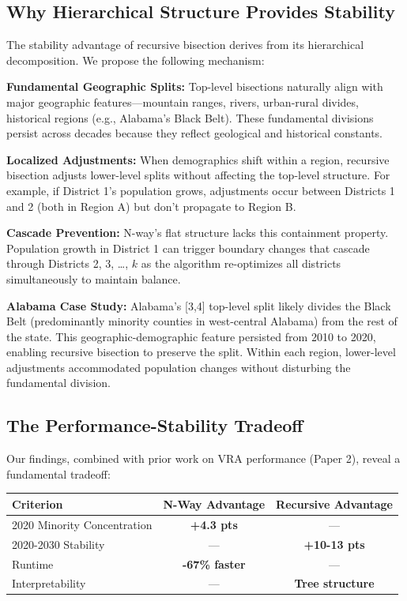 \subsection{Why Hierarchical Structure Provides Stability}

The stability advantage of recursive bisection derives from its hierarchical decomposition. We propose the following mechanism:

\textbf{Fundamental Geographic Splits:} Top-level bisections naturally align with major geographic features—mountain ranges, rivers, urban-rural divides, historical regions (e.g., Alabama's Black Belt). These fundamental divisions persist across decades because they reflect geological and historical constants.

\textbf{Localized Adjustments:} When demographics shift within a region, recursive bisection adjusts lower-level splits without affecting the top-level structure. For example, if District 1's population grows, adjustments occur between Districts 1 and 2 (both in Region A) but don't propagate to Region B.

\textbf{Cascade Prevention:} N-way's flat structure lacks this containment property. Population growth in District 1 can trigger boundary changes that cascade through Districts 2, 3, \ldots, $k$ as the algorithm re-optimizes all districts simultaneously to maintain balance.

\textbf{Alabama Case Study:} Alabama's [3,4] top-level split likely divides the Black Belt (predominantly minority counties in west-central Alabama) from the rest of the state. This geographic-demographic feature persisted from 2010 to 2020, enabling recursive bisection to preserve the split. Within each region, lower-level adjustments accommodated population changes without disturbing the fundamental division.

\subsection{The Performance-Stability Tradeoff}

Our findings, combined with prior work on VRA performance (Paper 2), reveal a fundamental tradeoff:

\begin{center}
\begin{tabular}{lcc}
\toprule
Criterion & N-Way Advantage & Recursive Advantage \\
\midrule
2020 Minority Concentration & \textbf{+4.3 pts} & — \\
2020-2030 Stability & — & \textbf{+10-13 pts} \\
Runtime & \textbf{-67\% faster} & — \\
Interpretability & — & \textbf{Tree structure} \\
\bottomrule
\end{tabular}
\end{center}

